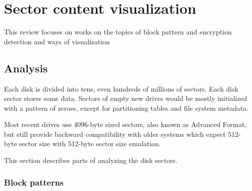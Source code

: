 \documentclass[
  digital, %
  color,   %
  oneside, %
  lof,     %
  nolot,     %
]{fithesis4}
\begin{document}


\chapter{Sector content visualization}
\label{chap:sector-content-visualization}

This review focuses on works on the topics of block pattern and encryption detection and ways of visualization

\section{Analysis}
\label{sec:analysis}

Each disk is divided into tens, even hundreds of millions of sectors.
Each disk sector stores some data.
Sectors of empty new drives would be mostly initialized with a pattern of zeroes, except for partitioning tables and file system metadata.

Most recent drives use 4096-byte sized sectors, also known as Advanced Format, but still provide backward compatibility with older systems which expect 512-byte sector size with 512-byte sector size emulation.\cite{seagate} 

This section describes parts of analyzing the disk sectors.

\subsection{Block patterns}
\label{ssec:block-analysis}
\end{document}
